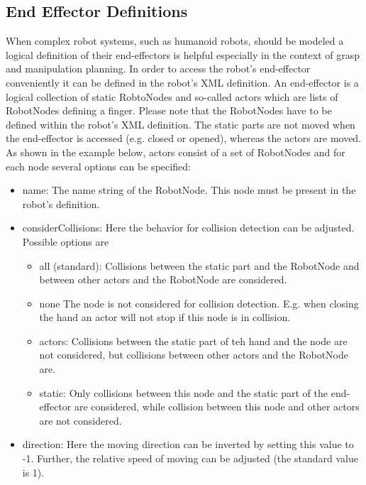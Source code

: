 \documentclass{book}
\begin{document}
\subsection{End Effector Definitions}
When complex robot systems, such as humanoid robots, should be modeled a logical definition of their end-effectors is helpful especially in the context of grasp and manipulation planning. In order to access the robot's end-effector conveniently it can be defined in the robot's XML definition. An end-effector is a logical collection of static RobtoNodes and so-called actors which are lists of RobotNodes defining a finger. Please note that the RobotNodes have to be defined within the robot's XML definition. The static parts are not moved when the end-effector is accessed (e.g. closed or opened), whereas the actors are moved. As shown in the example below, actors consist of a set of RobotNodes and for each node several options can be specified:
\begin{itemize}
  \item name: The name string of the RobotNode. This node must be present in the robot's definition. 
  \item considerCollisions: Here the behavior for collision detection can be adjusted. Possible options are 
  \begin{itemize}
    \item all (standard): Collisions between the static part and the RobotNode and between other actors and the RobotNode are considered. 
    \item none The node is not considered for collision detection. E.g. when closing the hand an actor will not stop if this node is in collision. 
    \item actors: Collisions between the static part of teh hand and the node are not considered, but collisions between other actors and the RobotNode are. 
    \item static: Only collisions between this node and the static part of the end-effector are considered, while collision between this node and other actors are not considered. 
  \end{itemize}

  \item direction: Here the moving direction can be inverted by setting this value to -1. Further, the relative speed of moving can be adjusted (the standard value is 1). 

\end{itemize}
\end{document}
